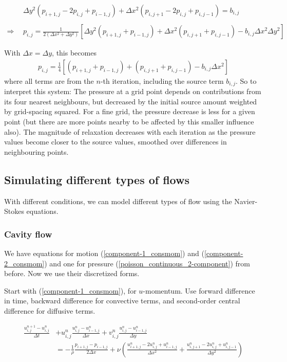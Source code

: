 \documentclass[11pt]{article}
\begin{document}
{\begin{align}
&\Delta y^2 (p_{i+1,j} - 2p_{i,j} + p_{i-1,j}) + \Delta x^2 (p_{i,j+1} - 2p_{i,j} + p_{i,j-1})
 = b_{i,j}
	\nonumber \\ \nonumber \\
\Rightarrow ~~&
p_{i,j} = \frac{1}{2(\Delta x^2 + \Delta y^2)}
		 \left[ \Delta y^2(p_{i+1,j} + p_{i-1,j}) + \Delta x^2(p_{i,j+1} + p_{i,j-1})
		 - b_{i,j} \Delta x^2 \Delta y^2 \right]
\end{align}

With $\Delta x = \Delta y$, this becomes
\begin{align}
p_{i,j} = \frac{1}{4}
		 \left[ (p_{i+1,j} + p_{i-1,j}) + (p_{i,j+1} + p_{i,j-1})
		 - b_{i,j} \Delta x^2 \right]
\label{transpoisson}
\end{align}
where all terms are from the $n$-th iteration, including the source term $b_{i,j}$.
So to interpret this system:
The pressure at a grid point depends on contributions from its four nearest
neighbours, but decreased by the initial source amount weighted by grid-spacing squared.
For a fine grid, the pressure decrease is less for a given point (but there are more points
nearby to be affected by this smaller influence also).
The magnitude of relaxation decreases with each iteration as the pressure values become closer
to the source values, smoothed over differences in neighbouring points.


\subsection{Simulating different types of flows}
With different conditions, we can model different types of flow using the Navier-Stokes equations.

\subsubsection{Cavity flow}
We have equations for motion (\ref{component-1_consmom}) and (\ref{component-2_consmom})
and one for pressure (\ref{poisson_continuous_2-component}) from before. Now we use their
discretized forms.

Start with (\ref{component-1_consmom}), for $u$-momentum. Use forward difference in time,
backward difference for convective terms, and second-order central difference for diffusive terms.

\begin{align}
\frac{u^{n+1}_{i,j}-u^n_{i,j}}{\Delta t}
	 &+ u^n_{i,j} \frac{u^n_{i,j}-u^n_{i-1,j}}{\Delta x}
	  + v^n_{i,j} \frac{u^n_{i,j}-u^n_{i-1,j}}{\Delta y} \nonumber\\
	&= -\frac{1}{\rho} \frac{p_{i+1,j}-p_{i-1,j}}{2 \Delta x}
	  + \nu \left( \frac{u^n_{i+1,j} - 2u^n_{i,j} + u^n_{i-1,j}}{\Delta x^2}
	  + \frac{u^n_{i,j+1} - 2u^n_{i,j} + u^n_{i,j-1}}{\Delta y^2} \right)
\end{align}

}
\end{document}
